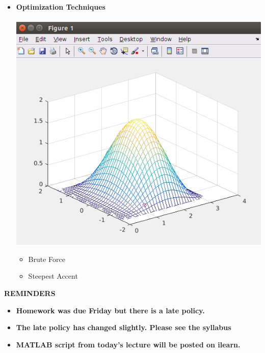 \documentclass[11pt]{article}
\begin{document}
\begin{itemize}
	\item \textbf{\LARGE Optimization Techniques}\\\\
		\includegraphics[scale=1]{lecture4_fig2.png}
		\begin{itemize}
			\item Brute Force \vspace{30mm}
			\item Steepest Accent	
		\end{itemize}
		\newpage

\end{itemize}
\textbf{ \LARGE REMINDERS } \\

\begin{itemize}

	\item \textbf{ \LARGE Homework was due Friday but there is a late policy.} \\
	
	\item \textbf{ \LARGE The late policy has changed slightly. Please see the syllabus} \\
	 
	\item \textbf{ \LARGE MATLAB script from today's lecture will be posted on ilearn. } \\
		
 \end{itemize}




	
\end{document}
